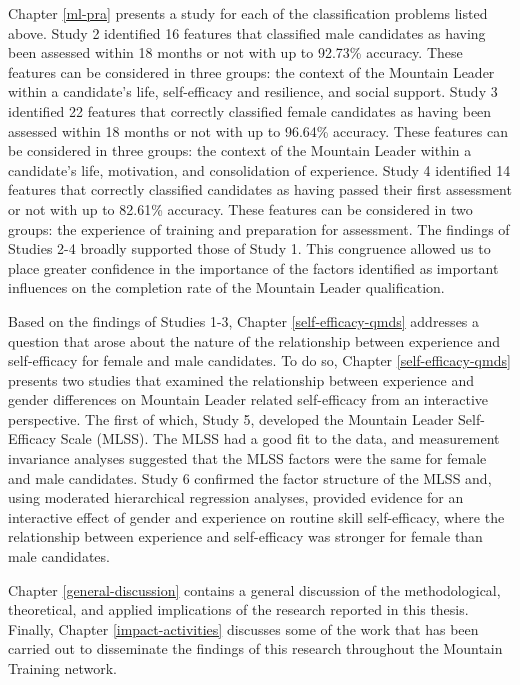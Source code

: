 \documentclass[
  12pt,
  a4paper,
]{book}
\begin{document}
Chapter \ref{ml-pra} presents a study for each of the classification problems listed above. Study 2 identified 16 features that classified male candidates as having been assessed within 18 months or not with up to 92.73\% accuracy. These features can be considered in three groups: the context of the Mountain Leader within a candidate's life, self-efficacy and resilience, and social support. Study 3 identified 22 features that correctly classified female candidates as having been assessed within 18 months or not with up to 96.64\% accuracy. These features can be considered in three groups: the context of the Mountain Leader within a candidate's life, motivation, and consolidation of experience. Study 4 identified 14 features that correctly classified candidates as having passed their first assessment or not with up to 82.61\% accuracy. These features can be considered in two groups: the experience of training and preparation for assessment. The findings of Studies 2-4 broadly supported those of Study 1. This congruence allowed us to place greater confidence in the importance of the factors identified as important influences on the completion rate of the Mountain Leader qualification.

Based on the findings of Studies 1-3, Chapter \ref{self-efficacy-qmds} addresses a question that arose about the nature of the relationship between experience and self-efficacy for female and male candidates. To do so, Chapter \ref{self-efficacy-qmds} presents two studies that examined the relationship between experience and gender differences on Mountain Leader related self-efficacy from an interactive perspective. The first of which, Study 5, developed the Mountain Leader Self-Efficacy Scale (MLSS). The MLSS had a good fit to the data, and measurement invariance analyses suggested that the MLSS factors were the same for female and male candidates. Study 6 confirmed the factor structure of the MLSS and, using moderated hierarchical regression analyses, provided evidence for an interactive effect of gender and experience on routine skill self-efficacy, where the relationship between experience and self-efficacy was stronger for female than male candidates.

Chapter \ref{general-discussion} contains a general discussion of the methodological, theoretical, and applied implications of the research reported in this thesis. Finally, Chapter \ref{impact-activities} discusses some of the work that has been carried out to disseminate the findings of this research throughout the Mountain Training network.
\end{document}
